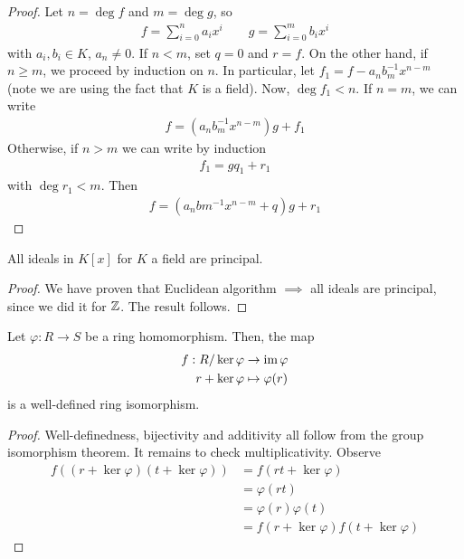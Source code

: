 \documentclass{../../template/note}
\begin{document}
    \begin{proof}
        Let $n = \deg f$ and $m = \deg g$, so
        \begin{align*}
            f = \sum_{i=0}^n a_ix^i \qquad g = \sum_{i=0}^m b_ix^i
        \end{align*}
        with $a_i, b_i \in K$, $a_n \neq 0$. If $n < m$, set $q = 0$ and $r = f$. On the other hand, if $n \geq m$, we proceed by induction on $n$. In particular, let $f_1 = f - a_n b_m^{-1} x^{n-m}$ (note we are using the fact that $K$ is a field). Now, $\deg f_1 < n$. If $n = m$, we can write
        \begin{align*}
            f = (a_nb_m^{-1}x^{n-m})g + f_1
        \end{align*}
        Otherwise, if $n > m$ we can write by induction
        \begin{align*}
            f_1 = gq_1 + r_1
        \end{align*}
        with $\deg r_1 < m$. Then
        \begin{align*}
            f = (a_nbm^{-1}x^{n-m}+q)g + r_1
        \end{align*}
    \end{proof}
    
    \begin{corollary*}
        All ideals in $K[x]$ for $K$ a field are principal.
    \end{corollary*}
    
    \begin{proof}
        We have proven that Euclidean algorithm $\implies$ all ideals are principal, since we did it for $\mathbb Z$. The result follows.
    \end{proof}
    
    \begin{theorem}
        Let $\varphi: R \to S$ be a ring homomorphism. Then, the map
        \begin{align*}
            f: R/\ker \varphi &\to \operatorname{im} \varphi \\
            r + \ker \varphi &\mapsto \varphi(r)
        \end{align*}
        is a well-defined ring isomorphism.        
    \end{theorem}
    
    \begin{proof}
        Well-definedness, bijectivity and additivity all follow from the group isomorphism theorem. It remains to check multiplicativity. Observe
        \begin{align*}
            f((r + \ker \varphi)(t + \ker \varphi)) &= f(rt + \ker \varphi) \\
            &= \varphi(rt) \\
            &= \varphi(r) \varphi(t) \\
            &= f(r + \ker \varphi)f(t + \ker \varphi)
        \end{align*}
    \end{proof}
    
\end{document}
